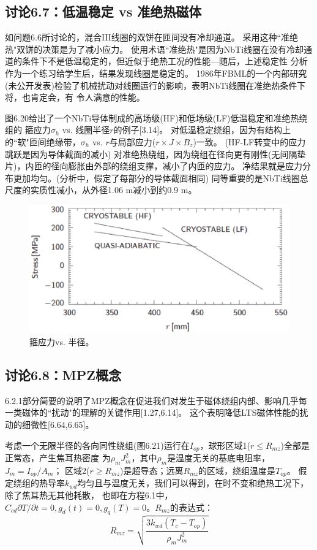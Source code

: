 \subsection{讨论6.7：低温稳定 vs 准绝热磁体}
如问题6.6所讨论的，混合III线圈的双饼在匝间没有冷却通道。
采用这种``准绝热"双饼的决策是为了减小应力。
使用术语``准绝热"是因为NbTi线圈在没有冷却通道的条件下不是低温稳定的，但近似于绝热工况的性能---随后，上述稳定性
分析作为一个练习给学生后，结果发现线圈是稳定的。
1986年FBML的一个内部研究(未公开发表)检验了机械扰动对线圈运行的影响，表明NbTi线圈在准绝热条件下将，也肯定会，有
令人满意的性能。

图6.20给出了一个NbTi导体制成的高场级(HF)和低场级(LF)低温稳定和准绝热绕组的
箍应力$\sigma_h$ vs. 线圈半径$r$的例子[3.14]。
对低温稳定绕组，因为有结构上的``软"匝间绝缘带，$\sigma_h$ vs. $r$与局部应力($r\times J\times B_z$)一致。
(HF-LF转变中的应力跳跃是因为导体截面的减小)
对准绝热绕组，因为绕组在径向更有刚性(无间隔垫片)，内匝的径向膨胀由外部的绕组支撑，减小了内匝的应力。
净结果就是应力分布更加均匀。(分析中，假定了每部分的导体截面相同)
同等重要的是NbTi线圈总尺度的实质性减小，从外径1.06 m减小到约0.9 m。

\begin{figure}[htbp]
	\centering
	\includegraphics[scale=0.7]{chpt6/figs/fig6.20.eps}
	\caption{箍应力vs. 半径。}
\end{figure}


\subsection{讨论6.8：MPZ概念}
6.2.1部分简要的说明了MPZ概念在促进我们对发生于磁体绕组内部、影响几乎每一类磁体的``扰动"的理解的关键作用[1.27,6.14]。
这个表明降低LTS磁体性能的扰动的细微性[6.64,6.65]。

考虑一个无限半径的各向同性绕组(图6.21)运行在$I_{op}$，球形区域1($r\le R_{mz}$)全部是正常态，产生焦耳热密度
为$\rho_m J_m^2$，其中$\rho_m$是温度无关的基底电阻率，$J_m=I_{op}/A_m$；
区域2($r\ge R_{mz}$)是超导态；远离$R_{mz}$的区域，绕组温度是$T_{op}$。
假定绕组的热导率$k_{wd}$均匀且与温度无关，我们可以得到，在时不变和绝热工况下，除了焦耳热无其他耗散，
也即在方程6.1中，$C_{cd}\partial T/\partial t=0,g_d(t)=0,g_q(T)=0$。$R_{mz}$的表达式：
\begin{equation}%
R_{mz}=\sqrt{\frac{3k_{wd}(T_c-T_{op})}{\rho_mJ_m^2}}
\end{equation}

